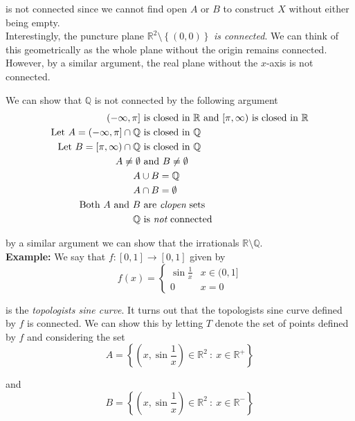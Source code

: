\documentclass[12pt]{article}
\newlength\tindent
\renewcommand{\indent}{\hspace*{\tindent}}
\newcommand{\R}{\mathbb R}
\newcommand{\Q}{\mathbb Q}
\begin{document}
is not connected since we cannot find open $A$ or $B$ to construct $X$ without either being empty. \\

\indent Interestingly, the puncture plane $\R^2\setminus \left\{(0,0)\right\}$ {\em is connected}. We can think of this geometrically as the whole plane without the origin remains connected. However, by a similar argument, the real plane without the $x$-axis is not connected.

We can show that $\Q$ is not connected by the following argument
\begin{align*}
	(-\infty,\pi] &\text{ is closed in $\R$ and $[\pi,\infty)$ is closed in $\R$} \\
	\text{Let } A = (-\infty,\pi] \cap \Q &\text{ is closed in $\Q$} \\
	\text{Let } B = [\pi,\infty) \cap \Q &\text{ is closed in $\Q$} \\
	A \neq \emptyset &\text{ and } B \neq \emptyset \\
	A &\cup B = \Q \\
	A &\cap B = \emptyset \\
	\text{Both $A$ and $B$} &\text{ are {\em clopen} sets} \\
	\Q &\text{ is {\em not} connected}
\end{align*}

by a similar argument we can show that the irrationals $\R\setminus\Q$. \\

%
%
%
{\bf Example:} We say that $f:[0,1]\to[0,1]$ given by
\begin{equation*}
	f(x) = 
	\begin{cases}
		\sin \frac{1}{x} & x \in (0, 1] \\
		0 & x = 0
	\end{cases}
\end{equation*}

is the {\em topologists sine curve}. It turns out that the topologists sine curve defined by $f$ is connected. We can show this by letting $T$ denote the set of points defined by $f$ and considering the set
\begin{equation*}
	A = \left\{ \left(x, \sin \frac{1}{x} \right) \in \R^2 ~:~ x \in \R^+ \right\}
\end{equation*}

and 
\begin{equation*}
	B = \left\{ \left(x, \sin \frac{1}{x} \right) \in \R^2 ~:~ x \in \R^- \right\}
\end{equation*}
\end{document}
